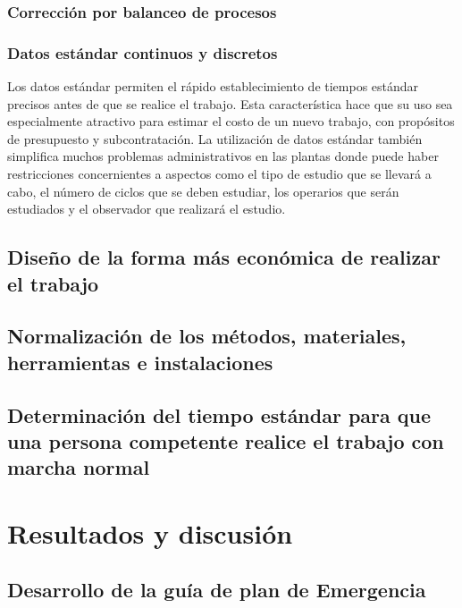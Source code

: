     \subsubsection{Corrección por balanceo de procesos}
    \subsubsection{Datos estándar continuos y discretos}
    Los datos estándar permiten el rápido establecimiento de tiempos estándar precisos antes de que se realice el trabajo. Esta característica hace que su uso sea especialmente atractivo para estimar el costo de un nuevo trabajo, con propósitos de presupuesto y subcontratación. La utilización de datos estándar también simplifica muchos problemas administrativos en las plantas donde puede haber restricciones concernientes a aspectos como el tipo de estudio que se llevará a cabo, el número de ciclos que se deben estudiar, los operarios que serán estudiados y el observador que realizará el estudio.
    
    \subsection{Diseño de la forma más económica de realizar el trabajo}
    
    \subsection{Normalización de los métodos, materiales, herramientas e instalaciones}
    
    \subsection{Determinación del tiempo estándar para que una persona competente realice el trabajo con marcha normal}
    
    
    \section{Resultados y discusión}
    
    \subsection{Desarrollo de la guía de plan de Emergencia}
    
